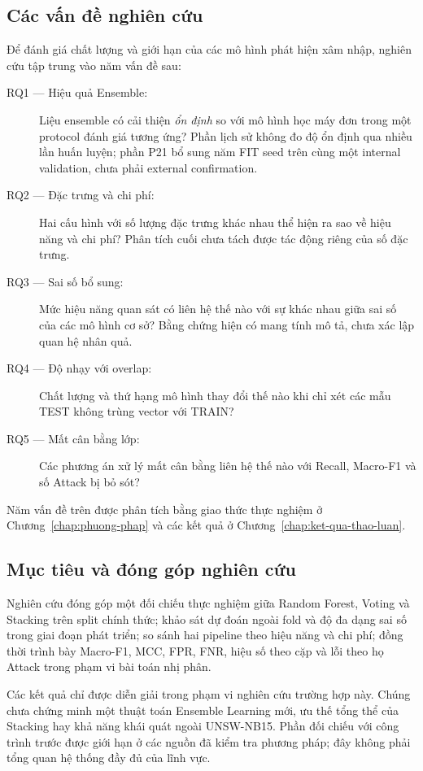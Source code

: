 \subsection{Các vấn đề nghiên cứu}
Để đánh giá chất lượng và giới hạn của các mô hình phát hiện xâm nhập, nghiên cứu tập trung vào năm vấn đề sau:

\begin{description}
\item[RQ1 --- Hiệu quả Ensemble:] Liệu ensemble có cải thiện \emph{ổn định} so với mô hình học máy đơn trong một protocol đánh giá tương ứng? Phần lịch sử không đo độ ổn định qua nhiều lần huấn luyện; phần P21 bổ sung năm FIT seed trên cùng một internal validation, chưa phải external confirmation.
\item[RQ2 --- Đặc trưng và chi phí:] Hai cấu hình với số lượng đặc trưng khác nhau thể hiện ra sao về hiệu năng và chi phí? Phân tích cuối chưa tách được tác động riêng của số đặc trưng.
\item[RQ3 --- Sai số bổ sung:] Mức hiệu năng quan sát có liên hệ thế nào với sự khác nhau giữa sai số của các mô hình cơ sở? Bằng chứng hiện có mang tính mô tả, chưa xác lập quan hệ nhân quả.
\item[RQ4 --- Độ nhạy với overlap:] Chất lượng và thứ hạng mô hình thay đổi thế nào khi chỉ xét các mẫu TEST không trùng vector với TRAIN?
\item[RQ5 --- Mất cân bằng lớp:] Các phương án xử lý mất cân bằng liên hệ thế nào với Recall, Macro-F1 và số Attack bị bỏ sót?
\end{description}

Năm vấn đề trên được phân tích bằng giao thức thực nghiệm ở Chương~\ref{chap:phuong-phap} và các kết quả ở Chương~\ref{chap:ket-qua-thao-luan}.

\subsection{Mục tiêu và đóng góp nghiên cứu}
Nghiên cứu đóng góp một đối chiếu thực nghiệm giữa Random Forest, Voting và Stacking trên split chính thức; khảo sát dự đoán ngoài fold và độ đa dạng sai số trong giai đoạn phát triển; so sánh hai pipeline theo hiệu năng và chi phí; đồng thời trình bày Macro-F1, MCC, FPR, FNR, hiệu số theo cặp và lỗi theo họ Attack trong phạm vi bài toán nhị phân.

Các kết quả chỉ được diễn giải trong phạm vi nghiên cứu trường hợp này. Chúng chưa chứng minh một thuật toán Ensemble Learning mới, ưu thế tổng thể của Stacking hay khả năng khái quát ngoài UNSW-NB15. Phần đối chiếu với công trình trước được giới hạn ở các nguồn đã kiểm tra phương pháp; đây không phải tổng quan hệ thống đầy đủ của lĩnh vực.

